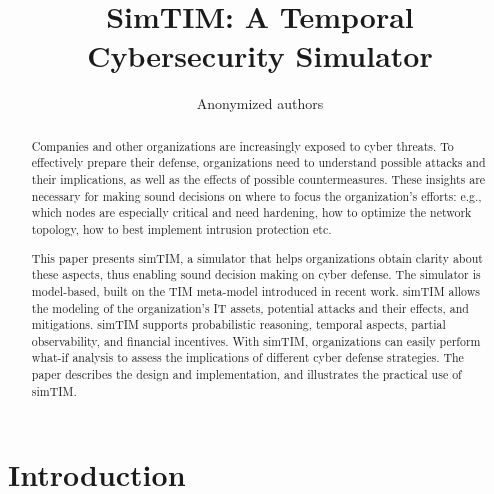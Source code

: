 \documentclass{llncs}
\begin{document}
\title{SimTIM: A Temporal Cybersecurity Simulator}
\author{Anonymized authors}

\maketitle

\begin{abstract}
Companies and other organizations are increasingly exposed to cyber threats.
To effectively prepare their defense, organizations need to understand possible attacks and their implications, as well as the effects of possible countermeasures.
These insights are necessary for making sound decisions on where to focus the organization's efforts: e.g., which nodes are especially critical and need hardening, how to optimize the network topology, how to best implement intrusion protection etc.

This paper presents simTIM, a simulator that helps organizations obtain clarity about these aspects, thus enabling sound decision making on cyber defense.
The simulator is model-based, built on the TIM meta-model introduced in recent work.
simTIM allows the modeling of the organization's IT assets, potential attacks and their effects, and mitigations.
simTIM supports probabilistic reasoning, temporal aspects, partial observability, and financial incentives.
With simTIM, organizations can easily perform what-if analysis to assess the implications of different cyber defense strategies.
The paper describes the design and implementation, and illustrates the practical use of simTIM.
\end{abstract}


\section{Introduction}
\end{document}
